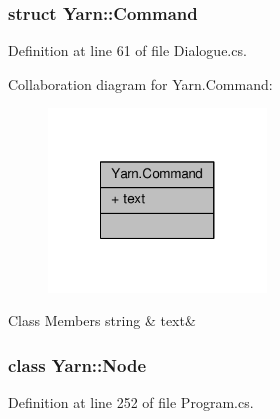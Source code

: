 \subsubsection{struct Yarn\-:\-:Command}


Definition at line 61 of file Dialogue.\-cs.



Collaboration diagram for Yarn.\-Command\-:
\nopagebreak
\begin{figure}[H]
\begin{center}
\leavevmode
\includegraphics[width=164pt]{a00395}
\end{center}
\end{figure}
\begin{DoxyFields}{Class Members}
\hypertarget{a00053_a8564e5104566e145f5d917ec846444d9}{string}\label{a00053_a8564e5104566e145f5d917ec846444d9}
&
text&
\\
\hline

\end{DoxyFields}
\label{a00382}
\hypertarget{a00053_a00382}{}
\subsubsection{class Yarn\-:\-:Node}


Definition at line 252 of file Program.\-cs.



